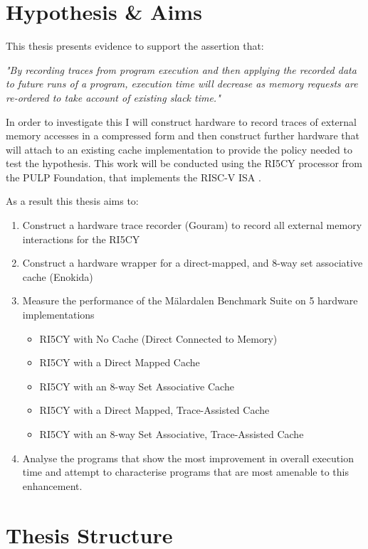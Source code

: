 \section{Hypothesis \& Aims}

This thesis presents evidence to support the assertion that:

\emph{"By recording traces from program execution and then applying the recorded data to future runs of a program, execution time will decrease as memory requests are re-ordered to take account of existing slack time."}

In order to investigate this I will construct hardware to record traces of external memory accesses in a compressed form and then construct further hardware that will attach to an existing cache implementation to provide the policy needed to test the hypothesis. This work will be conducted using the RI5CY processor \cite{gautschiNearThresholdRISCVCore2017} from the PULP Foundation, that implements the RISC-V ISA \cite{watermanRISCVInstructionSet2019}.

As a result this thesis aims to:

\begin{enumerate}
	\item Construct a hardware trace recorder (Gouram) to record all external memory interactions for the RI5CY
	\item Construct a hardware wrapper for a direct-mapped, and 8-way set associative cache (Enokida) 
	\item Measure the performance of the Mälardalen Benchmark Suite \cite{gustafssonMalardalenWCETBenchmarks2010} on 5 hardware implementations
	\begin{itemize}
		\item RI5CY with No Cache (Direct Connected to Memory)
		\item RI5CY with a Direct Mapped Cache
		\item RI5CY with an 8-way Set Associative Cache
		\item RI5CY with a Direct Mapped, Trace-Assisted Cache
		\item RI5CY with an 8-way Set Associative, Trace-Assisted Cache
	\end{itemize}
	\item Analyse the programs that show the most improvement in overall execution time and attempt to characterise programs that are most amenable to this enhancement.
\end{enumerate}

\section{Thesis Structure}

